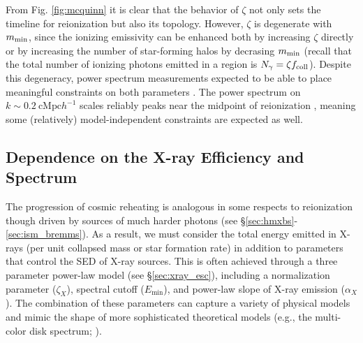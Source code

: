 From Fig. \ref{fig:mcquinn} it is clear that the behavior of $\zeta$ not only sets the timeline for reionization but also its topology. However, $\zeta$ is degenerate with $m_{\text{min}}$, since the ionizing emissivity can be enhanced both by increasing $\zeta$ directly or by increasing the number of star-forming halos by decrasing $m_{\text{min}}$ (recall that the total number of ionizing photons emitted in a region is $N_{\gamma} = \zeta f_{\text{coll}}$). Despite this degeneracy, power spectrum measurements expected to be able to place meaningful constraints on both parameters \cite{Greig2017}. The power spectrum on $k \sim 0.2 \ \mathrm{cMpc} h^{-1}$ scales reliably peaks near the midpoint of reionization \cite{Lidz2008}, meaning some (relatively) model-independent constraints are expected as well.




\subsection{Dependence on the X-ray Efficiency and Spectrum} \label{sec:dep_xray}
The progression of cosmic reheating is analogous in some respects to reionization though driven by sources of much harder photons (see \S\ref{sec:hmxbs}-\ref{sec:ism_bremms}). As a result, we must consider the total energy emitted in X-rays (per unit collapsed mass or star formation rate) in addition to parameters that control the SED of X-ray sources. This is often achieved through a three parameter power-law model (see \S\ref{sec:xray_esc}), including a normalization parameter ($\zeta_X$), spectral cutoff ($E_{\min}$), and power-law slope of X-ray emission ($\alpha_X$). The combination of these parameters can capture a variety of physical models and mimic the shape of more sophisticated theoretical models (e.g., the multi-color disk spectrum; \cite{Mitsuda1984}).

